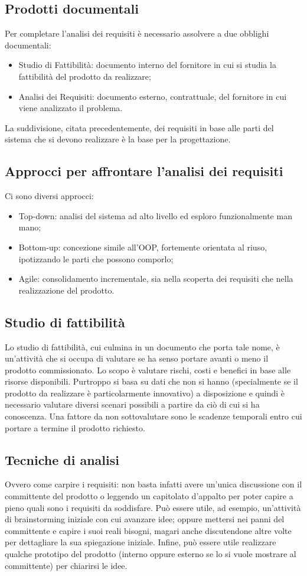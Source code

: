 \documentclass[../main]{subfiles}
\begin{document}
\subsection{Prodotti documentali}
Per completare l'analisi dei requisiti è necessario assolvere a due obblighi documentali:
\begin{itemize}
    \item Studio di Fattibilità: documento interno del fornitore in cui si studia la fattibilità del prodotto da realizzare;
    \item Analisi dei Requisiti: documento esterno, contrattuale, del fornitore in cui viene analizzato il problema.
\end{itemize}
La suddivisione, citata precedentemente, dei requisiti in base alle parti del sistema che si devono realizzare è la base per la progettazione.
\subsection{Approcci per affrontare l'analisi dei requisiti}
Ci sono diversi approcci:
\begin{itemize}
    \item Top-down: analisi del sistema ad alto livello ed esploro funzionalmente man mano;
    \item Bottom-up: concezione simile all'OOP, fortemente orientata al riuso, ipotizzando le parti che possono comporlo;
    \item Agile: consolidamento incrementale, sia nella scoperta dei requisiti che nella realizzazione del prodotto.
\end{itemize}
\subsection{Studio di fattibilità}
Lo studio di fattibilità, cui culmina in un documento che porta tale nome, è un'attività che si occupa di valutare se ha senso portare avanti o meno il prodotto commissionato.\newline
Lo scopo è valutare rischi, costi e benefici in base alle risorse disponibili. Purtroppo si basa su dati che non si hanno (specialmente se il prodotto da realizzare è particolarmente innovativo) a disposizione e quindi è necessario valutare diversi scenari possibili a partire da ciò di cui si ha conoscenza.
Una fattore da non sottovalutare sono le scadenze temporali entro cui portare a termine il prodotto richiesto.
\subsection{Tecniche di analisi}
Ovvero come carpire i requisiti: non basta infatti avere un'unica discussione con il committente del prodotto o leggendo un capitolato d'appalto per poter capire a pieno quali sono i requisiti da soddisfare. Può essere utile, ad esempio, un'attività di brainstorming iniziale con cui avanzare idee; oppure mettersi nei panni del committente e capire i suoi reali bisogni, magari anche discutendone altre volte per dettagliare la sua spiegazione iniziale. Infine, può essere utile realizzare qualche prototipo del prodotto (interno oppure esterno se lo si vuole mostrare al committente) per chiarirsi le idee.
\end{document}

